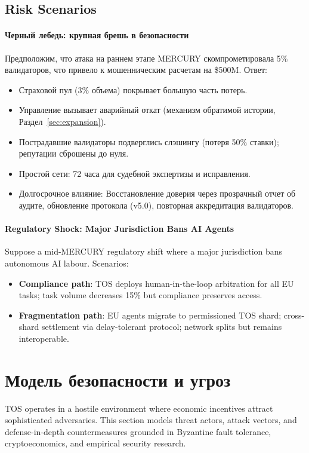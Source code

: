 \documentclass[11pt]{article}
\begin{document}
\subsection{Risk Scenarios}
\paragraph{Черный лебедь: крупная брешь в безопасности}
Предположим, что атака на раннем этапе MERCURY скомпрометировала 5\% валидаторов, что привело к мошенническим расчетам на \$500M. Ответ:
\begin{itemize}[noitemsep]
  \item Страховой пул (3\% объема) покрывает большую часть потерь.
  \item Управление вызывает аварийный откат (механизм обратимой истории, Раздел~\ref{sec:expansion}).
  \item Пострадавшие валидаторы подверглись слэшингу (потеря 50\% ставки); репутации сброшены до нуля.
  \item Простой сети: 72 часа для судебной экспертизы и исправления.
  \item Долгосрочное влияние: Восстановление доверия через прозрачный отчет об аудите, обновление протокола (v5.0), повторная аккредитация валидаторов.
\end{itemize}

\paragraph{Regulatory Shock: Major Jurisdiction Bans AI Agents}
Suppose a mid-MERCURY regulatory shift where a major jurisdiction bans autonomous AI labour. Scenarios:
\begin{itemize}[noitemsep]
  \item \textbf{Compliance path}: TOS deploys human-in-the-loop arbitration for all EU tasks; task volume decreases 15\% but compliance preserves access.
  \item \textbf{Fragmentation path}: EU agents migrate to permissioned TOS shard; cross-shard settlement via delay-tolerant protocol; network splits but remains interoperable.
\end{itemize}

\section{Модель безопасности и угроз}
\label{sec:security}

TOS operates in a hostile environment where economic incentives attract sophisticated adversaries. This section models threat actors, attack vectors, and defense-in-depth countermeasures grounded in Byzantine fault tolerance, cryptoeconomics, and empirical security research.
\end{document}
